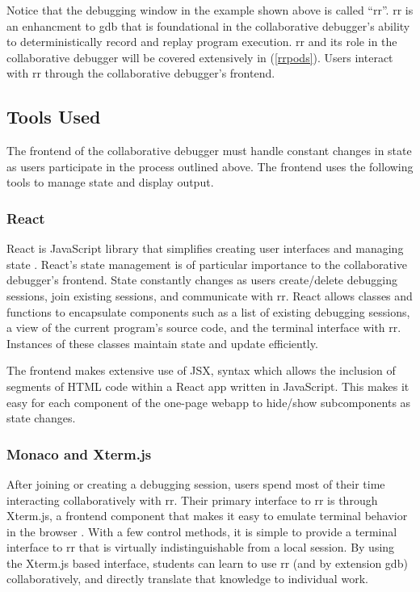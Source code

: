 \documentclass[12pt]{article}
\begin{document}
Notice that the debugging window in the example shown above is called
``rr''.  rr is an enhancment to gdb that is foundational in the
collaborative debugger's ability to deterministically record and
replay program execution. rr and its role in the collaborative
debugger will be covered extensively in (\ref{rrpods}).  Users
interact with rr through the collaborative debugger's frontend.

\subsection{Tools Used}

The frontend of the collaborative debugger must handle constant
changes in state as users participate in the process outlined above.
The frontend uses the following tools to manage state and display
output.

\subsubsection{React}\label{react}

React is JavaScript library that simplifies creating user interfaces
and managing state \cite{react}.  React's state management is of
particular importance to the collaborative debugger's frontend.  State
constantly changes as users create/delete debugging sessions, join
existing sessions, and communicate with rr.  React allows classes and
functions to encapsulate components such as a list of existing
debugging sessions, a view of the current program's source code, and
the terminal interface with rr.  Instances of these classes maintain
state and update efficiently.
\par

The frontend makes extensive use of JSX, syntax which allows the
inclusion of segments of HTML code within a React app written in
JavaScript.  This makes it easy for each component of the one-page
webapp to hide/show subcomponents as state changes.

\subsubsection{Monaco and Xterm.js}\label{xtermjs/monaco}

After joining or creating a debugging session, users spend most of
their time interacting collaboratively with rr.  Their primary
interface to rr is through Xterm.js, a frontend component that makes
it easy to emulate terminal behavior in the browser \cite{xtermjs}.
With a few control methods, it is simple to provide a terminal
interface to rr that is virtually indistinguishable from a local
session.  By using the Xterm.js based interface, students can learn to
use rr (and by extension gdb) collaboratively, and directly translate
that knowledge to individual work.
\par
\end{document}
